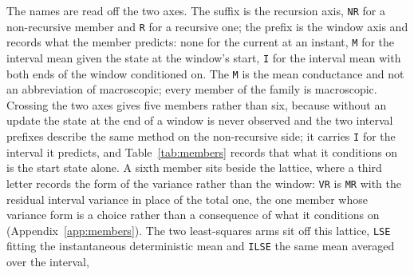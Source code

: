 The names are read off the two axes. The suffix is the recursion axis, \texttt{NR} for a
non-recursive member and \texttt{R} for a recursive one; the
prefix is the window axis and records what the member predicts: none for the current at an
instant, \texttt{M} for the interval mean given the state at the window's start, \texttt{I} for
the interval mean with both ends of the window conditioned on. The \texttt{M} is the mean
conductance and not an abbreviation of macroscopic; every member of the family is macroscopic.
Crossing the two axes gives five members rather than six, because without an update the state at
the end of a window is never observed and the two interval prefixes describe the same method on
the non-recursive side; it carries \texttt{I} for the interval it predicts, and
Table~\ref{tab:members} records that what it conditions on is the start state alone. A sixth
member sits beside the lattice, where a third letter records the form of the variance rather than
the window: \texttt{VR} is \texttt{MR} with the residual interval variance in place of the total
one, the one member whose variance form is a choice rather than a consequence of what it
conditions on (Appendix~\ref{app:members}). The two least-squares arms sit off this lattice, \texttt{LSE} fitting
the instantaneous deterministic mean and \texttt{ILSE} the same mean averaged over the interval,
